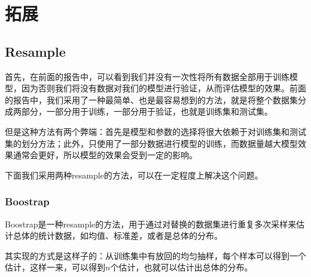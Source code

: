 \documentclass[]{article}
\begin{document}
%


\section{拓展}





%
\subsection{Resample}\label{resample}

首先，在前面的报告中，可以看到我们并没有一次性将所有数据全部用于训练模型，因为否则我们将没有数据对我们的模型进行验证，从而评估模型的效果。前面的报告中，我们采用了一种最简单、也是最容易想到的方法，就是将整个数据集分成两部分，一部分用于训练，一部分用于验证，也就是训练集和测试集。

但是这种方法有两个弊端：首先是模型和参数的选择将很大依赖于对训练集和测试集的划分方法；此外，只使用了一部分数据进行模型的训练，而数据量越大模型效果通常会更好，所以模型的效果会受到一定的影响。

下面我们采用两种resample的方法，可以在一定程度上解决这个问题。

\subsubsection{Boostrap}\label{boostrap}

Boostrap是一种resample的方法，用于通过对替换的数据集进行重复多次采样来估计总体的统计数据，如均值、标准差，或者是总体的分布。

其实现的方式是这样子的：从训练集中有放回的均匀抽样，每个样本可以得到一个估计，这样一来，可以得到\(n\)个估计，也就可以估计出总体的分布。
\end{document}
